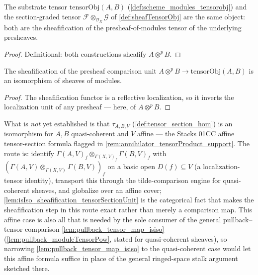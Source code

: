 \begin{lemma}
  \label{lem:tensorObj_iso_sheafTensorObj}
  The substrate tensor \(\mathrm{tensorObj}(A,B)\)
  (\cref{def:scheme_modules_tensorobj}) and the section-graded tensor
  \(\mathcal F \otimes_{\mathcal O_X} \mathcal G\) of \cref{def:sheafTensorObj}
  are the same object: both are the sheafification of the presheaf-of-modules
  tensor of the underlying presheaves.
\end{lemma}
\begin{proof}\leanok
  Definitional: both constructions sheafify \(A \otimes^p B\).
\end{proof}

\begin{lemma}
  \label{lem:isIso_sheafification_tensorSectionUnit}
  The sheafification of the presheaf comparison unit
  \(A \otimes^p B \to \mathrm{tensorObj}(A,B)\) is an isomorphism of sheaves
  of modules.
\end{lemma}
\begin{proof}\leanok
  The sheafification functor is a reflective localization, so it inverts the
  localization unit of any presheaf --- here, of \(A \otimes^p B\).
\end{proof}

\begin{remark}
  \label{rem:tensor_section_formula_gap}
  What is \emph{not} yet established is that \(\tau_{A,B,V}\)
  (\cref{def:tensor_section_hom}) is an isomorphism for \(A, B\)
  quasi-coherent and \(V\) affine --- the Stacks 01CC affine tensor-section
  formula flagged in \cref{rem:annihilator_tensorProduct_support}. The route
  is: identify \(\Gamma(A,V)_f \otimes_{\Gamma(X,V)_f} \Gamma(B,V)_f\) with
  \((\Gamma(A,V) \otimes_{\Gamma(X,V)} \Gamma(B,V))_f\) on a basic open
  \(D(f) \subseteq V\) (a localization-tensor identity), transport this
  through the tilde-comparison engine for quasi-coherent sheaves, and
  globalize over an affine cover; \cref{lem:isIso_sheafification_tensorSectionUnit}
  is the categorical fact that makes the sheafification step in this route
  exact rather than merely a comparison map. This affine case is also all
  that is needed by the sole consumer of the general pullback--tensor
  comparison \cref{lem:pullback_tensor_map_isiso}
  (\cref{lem:pullback_moduleTensorPow}, stated for quasi-coherent sheaves),
  so narrowing \cref{lem:pullback_tensor_map_isiso} to the quasi-coherent
  case would let this affine formula suffice in place of the general
  ringed-space stalk argument sketched there.
\end{remark}

